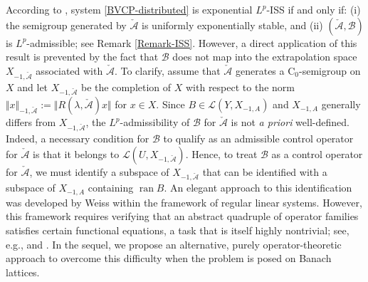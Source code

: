 \documentclass[onecolumn]{autart}
\def\la{\lambda}
\numberwithin{equation}{section}
\begin{document}
    According to \cite[Prop. 2.10]{JaNPS},  system \eqref{BVCP-distributed} is exponential $L^p$-ISS  if and only if: (i) the semigroup generated by $\check{\mathcal{A}}$ is uniformly exponentially stable, and (ii) $(\check{\mathcal{A}},\mathcal{B})$ is $L^p$-admissible; see Remark \ref{Remark-ISS}. However, a direct application of this result is prevented by the fact that $\mathcal{B}$ does not map into the extrapolation space $X_{-1,\check{\mathcal{A}}}$ associated with $\check{\mathcal{A}}$. To clarify, assume that $\check{\mathcal{A}}$ generates a C$_0$-semigroup on $X$ and let $X_{-1,\check{\mathcal{A}}}$ be the completion of $X$ with respect to the norm $\Vert x\Vert_{-1,\check{\mathcal{A}}}:=\Vert R(\la, \check{\mathcal{A}})x\Vert$ for $x\in X$. Since $B \in \mathcal{L}(Y,X_{-1,A})$ and $X_{-1,A}$ generally differs from $X_{-1,\check{\mathcal{A}}}$, the $L^p$-admissibility of $\mathcal{B}$ for $\check{\mathcal{A}}$ is not \textit{a priori} well-defined. Indeed, a necessary condition for $\mathcal{B}$ to qualify as an admissible control operator for $\check{\mathcal{A}}$ is that it belongs to $\mathcal{L}(U, X_{-1,\check{\mathcal{A}}})$. Hence, to treat $\mathcal{B}$ as a control operator for $\check{\mathcal{A}}$, we must identify a subspace of $X_{-1,\check{\mathcal{A}}}$ that can be identified with a subspace of $X_{-1,A}$ containing $\operatorname{ran} B$. An elegant approach to this identification was developed by Weiss \cite{WF} within the framework of regular linear systems. However, this framework requires verifying that an abstract quadruple of operator families satisfies certain functional equations, a task that is itself highly nontrivial; see, e.g., \cite[Thm.~6.1, Thm.~7.2, and Prop.~7.10]{WF} and \cite[Thm.~7.1.2 and Thm.~7.5.3]{Staffans}. In the sequel, we propose an alternative, purely operator-theoretic approach to overcome this difficulty when the problem is posed on Banach lattices.
\end{document}
